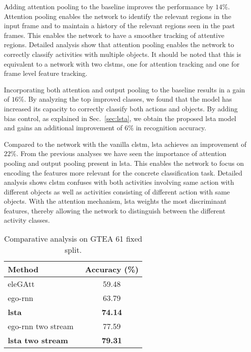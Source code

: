 \documentclass[10pt,twocolumn,letterpaper]{article}
\begin{document}
Adding attention pooling to the baseline improves the performance by $14\%$. Attention pooling enables the network to identify the relevant  regions in the input frame and to maintain a history of the relevant regions seen in the past frames. This enables the network to have a smoother tracking of attentive regions. Detailed analysis show that attention pooling enables the network to correctly classify activities with multiple objects. It should be noted that this is equivalent to a network with two \ac{clstm}s, one for attention tracking and one for frame level feature tracking. 

Incorporating both attention and output pooling to the baseline results in a gain of $16\%$. By analyzing the top improved classes, we found that the model has increased its capacity to correctly classify both actions and objects. By adding bias control, as explained in Sec.~\ref{sec:lsta}, we obtain the proposed \ac{lsta} model and gains an additional improvement of $6\%$ in recognition accuracy.

Compared to the network with the vanilla \ac{clstm}, \ac{lsta} achieves an improvement of $22\%$. From the previous analyses we have seen the importance of attention pooling and output pooling present in \ac{lsta}. This enables the network to focus on encoding the features more relevant for the concrete classification task. Detailed analysis shows \ac{clstm} confuses with both activities involving same action with different objects as well as activities consisting of different action with same objects. With the attention mechanism, \ac{lsta} weights the most discriminant features, thereby allowing the network to distinguish between the different activity classes.

\begin{table}[t]\small
	\centering
	\begin{tabular}{|l|c|}
		\hline
		Method & Accuracy (\%) \\ \hline \hline
        eleGAtt~\cite{attention_eccv18} & 59.48 \\ \hline
		ego-rnn~\cite{sudhakaran2018attention} & 63.79 \\ \hline
		\textbf{\ac{lsta}} & \textbf{74.14} \\ \hline \hline
		ego-rnn two stream~\cite{sudhakaran2018attention} & 77.59 \\ \hline
		\textbf{\ac{lsta} two stream} & \textbf{79.31} \\ \hline
	\end{tabular}
\vspace{-0.2cm}
	\caption{Comparative analysis on GTEA 61 fixed split.}
	\label{tab:comp}\vspace{-0.4cm}
\end{table}
\end{document}
